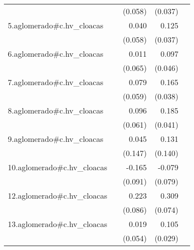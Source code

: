 {\begin{longtable}{l*{4}{D{.}{.}{-1}}}
            &                     &     (0.058)         &     (0.037)         &                     \\
\addlinespace
5.aglomerado#c.hv\_cloacas&                     &       0.040         &       0.125\sym{***}&                     \\
            &                     &     (0.058)         &     (0.037)         &                     \\
\addlinespace
6.aglomerado#c.hv\_cloacas&                     &       0.011         &       0.097\sym{*}  &                     \\
            &                     &     (0.065)         &     (0.046)         &                     \\
\addlinespace
7.aglomerado#c.hv\_cloacas&                     &       0.079         &       0.165\sym{***}&                     \\
            &                     &     (0.059)         &     (0.038)         &                     \\
\addlinespace
8.aglomerado#c.hv\_cloacas&                     &       0.096         &       0.185\sym{***}&                     \\
            &                     &     (0.061)         &     (0.041)         &                     \\
\addlinespace
9.aglomerado#c.hv\_cloacas&                     &       0.045         &       0.131         &                     \\
            &                     &     (0.147)         &     (0.140)         &                     \\
\addlinespace
10.aglomerado#c.hv\_cloacas&                     &      -0.165         &      -0.079         &                     \\
            &                     &     (0.091)         &     (0.079)         &                     \\
\addlinespace
12.aglomerado#c.hv\_cloacas&                     &       0.223\sym{**} &       0.309\sym{***}&                     \\
            &                     &     (0.086)         &     (0.074)         &                     \\
\addlinespace
13.aglomerado#c.hv\_cloacas&                     &       0.019         &       0.105\sym{***}&                     \\
            &                     &     (0.054)         &     (0.029)         &                     \\

\end{longtable}}

